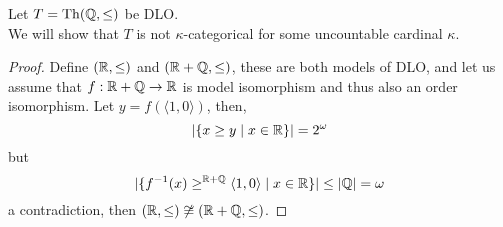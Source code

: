 \question{}
Let $T = \operatorname{Th}(\mathbb{Q}, \le)$ be DLO\@. \\
We will show that $T$ is not $\kappa$-categorical for some uncountable cardinal $\kappa$.
\begin{proof}
	Define $(\mathbb{R}, \le)$ and $(\mathbb{R} + \mathbb{Q}, \le)$, these are both models of DLO, and let us assume that $f : \mathbb{R} + \mathbb{Q} \to \mathbb{R}$ is model isomorphism and thus also an order isomorphism.
	Let $y = f(\langle 1, 0 \rangle)$, then,
	\[
		|\{ x \ge y \mid x \in \mathbb{R} \}|
		= 2^{\omega}
	\]
	but
	\[
		|\{ f^{-1}(x) \ge^{\mathbb{R} + \mathbb{Q}} \langle 1, 0 \rangle \mid x \in \mathbb{R} \}|
		\le |\mathbb{Q}|
		= \omega
	\]
	a contradiction, then $(\mathbb{R}, \le) \not\cong (\mathbb{R} + \mathbb{Q}, \le)$.
\end{proof}



